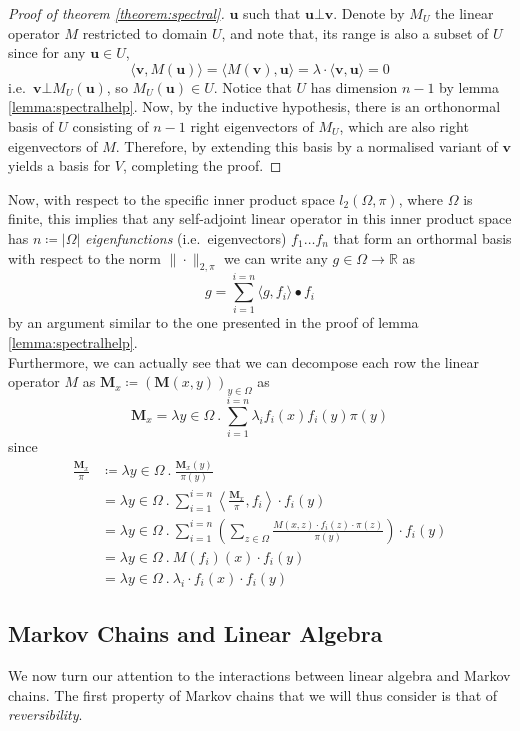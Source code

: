 \begin{proof}[Proof of theorem \ref{theorem:spectral}]
		$\mathbf{u}$ such that $\mathbf{u}\bot\mathbf{v}$. Denote by $M_U$ the linear 
		operator $M$ restricted to domain $U$, and note that, its range is also a subset 
		of $U$ since for any $\mathbf{u}\in U$,
		$$
			\langle \mathbf{v},M(\mathbf{u})\rangle =
			\langle M(\mathbf{v}),\mathbf{u}\rangle = 
			\lambda \cdot \langle\mathbf{v} , \mathbf{u}\rangle =
			0
		$$
		i.e.\ $\mathbf{v}\bot M_U(\mathbf{u})$, so $M_U(\mathbf{u})\in U$. Notice that $U$ 
		has dimension $n-1$ by lemma \ref{lemma:spectralhelp}. 
		Now, by the inductive hypothesis, 
		there is an orthonormal basis of $U$ consisting of $n-1$ right eigenvectors of 
		$M_U$, which are also right eigenvectors of $M$. Therefore, by extending this 
		basis by a normalised variant of $\mathbf{v}$ yields a basis for $V$, completing 
		the proof.
	\end{proof}

	Now, with respect to the specific inner product space $l_2(\Omega, \pi)$, where $\Omega$ 
	is finite, this implies that any self-adjoint linear operator in this inner product space 
	has $n \coloneqq |\Omega|$ \emph{eigenfunctions} (i.e.\ eigenvectors) $f_1\hdots f_n$ that 
	form an orthormal basis with respect to the norm $\|\cdot\|_{2,\pi}$ we can write any $g 
	\in \Omega\rightarrow \mathbb{R}$ as 
	$$
		g = \sum_{i=1}^{i=n} \langle g, f_i \rangle \bullet f_i
	$$
	by an argument similar to the one presented in the proof of lemma \ref{lemma:spectralhelp}.
	\\
	Furthermore, we can actually see that we can decompose each row the linear operator $M$ as
	$\mathbf{M}_x \coloneqq (\mathbf{M}(x,y))_{y\in\Omega}$ as
	$$
		\mathbf{M}_x = \lambda y\in\Omega\ .\ \sum_{i=1}^{i=n}\lambda_i f_i(x)f_i(y)\pi(y)
	$$
	since 
	\begin{align*}
		\frac{\mathbf{M}_x}{\pi}
		&\coloneqq\lambda y\in\Omega\ .\ \frac{\mathbf{M}_x(y)}{\pi(y)} \\
		&= \lambda y\in\Omega\ .\ \sum_{i=1}^{i=n} 
		\left\langle \frac{\mathbf{M}_x}{\pi} , f_i\right\rangle\cdot f_i(y) \\
		&= \lambda y\in\Omega\ .\ \sum_{i=1}^{i=n} 
		\left(\sum_{z\in\Omega}\frac{M(x,z) \cdot f_i(z) \cdot \pi(z)}{\pi(y)}\right)\cdot 
		f_i(y) \\
		&= \lambda y\in\Omega\ .\ M(f_i)(x) \cdot f_i(y) \\ 
		&= \lambda y\in\Omega\ .\ \lambda_i \cdot f_i(x) \cdot f_i(y)
	\end{align*}

	\subsection{Markov Chains and Linear Algebra}
	We now turn our attention to the interactions between linear algebra and Markov chains. The 
	first property of Markov chains that we will thus consider is that of \emph{reversibility}.

